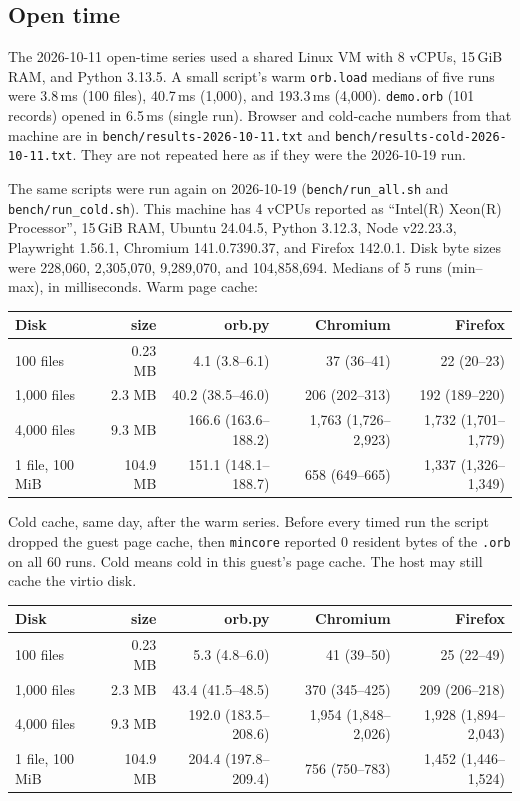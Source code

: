 \documentclass[11pt]{article}
\begin{document}
\subsection{Open time}

The 2026-10-11 open-time series used a shared Linux VM with 8 vCPUs, 15\,GiB RAM, and Python 3.13.5.
A small script's warm \texttt{orb.load} medians of five runs were 3.8\,ms (100 files), 40.7\,ms (1,000), and 193.3\,ms (4,000).
\texttt{demo.orb} (101 records) opened in 6.5\,ms (single run).
Browser and cold-cache numbers from that machine are in \texttt{bench/results-2026-10-11.txt} and \texttt{bench/results-cold-2026-10-11.txt}.
They are not repeated here as if they were the 2026-10-19 run.

The same scripts were run again on 2026-10-19 (\texttt{bench/run\_all.sh} and \texttt{bench/run\_cold.sh}).
This machine has 4 vCPUs reported as ``Intel(R) Xeon(R) Processor'', 15\,GiB RAM, Ubuntu 24.04.5, Python 3.12.3, Node v22.23.3, Playwright 1.56.1, Chromium 141.0.7390.37, and Firefox 142.0.1.
Disk byte sizes were 228{,}060, 2{,}305{,}070, 9{,}289{,}070, and 104{,}858{,}694.
Medians of 5 runs (min--max), in milliseconds.
Warm page cache:

\begin{center}
\small
\begin{tabular}{lrrrr}
\toprule
Disk & size & orb.py & Chromium & Firefox \\
\midrule
100 files & 0.23 MB & 4.1 (3.8--6.1) & 37 (36--41) & 22 (20--23) \\
1,000 files & 2.3 MB & 40.2 (38.5--46.0) & 206 (202--313) & 192 (189--220) \\
4,000 files & 9.3 MB & 166.6 (163.6--188.2) & 1{,}763 (1{,}726--2{,}923) & 1{,}732 (1{,}701--1{,}779) \\
1 file, 100 MiB & 104.9 MB & 151.1 (148.1--188.7) & 658 (649--665) & 1{,}337 (1{,}326--1{,}349) \\
\bottomrule
\end{tabular}
\end{center}

Cold cache, same day, after the warm series.
Before every timed run the script dropped the guest page cache, then \texttt{mincore} reported 0 resident bytes of the \texttt{.orb} on all 60 runs.
Cold means cold in this guest's page cache.
The host may still cache the virtio disk.

\begin{center}
\small
\begin{tabular}{lrrrr}
\toprule
Disk & size & orb.py & Chromium & Firefox \\
\midrule
100 files & 0.23 MB & 5.3 (4.8--6.0) & 41 (39--50) & 25 (22--49) \\
1,000 files & 2.3 MB & 43.4 (41.5--48.5) & 370 (345--425) & 209 (206--218) \\
4,000 files & 9.3 MB & 192.0 (183.5--208.6) & 1{,}954 (1{,}848--2{,}026) & 1{,}928 (1{,}894--2{,}043) \\
1 file, 100 MiB & 104.9 MB & 204.4 (197.8--209.4) & 756 (750--783) & 1{,}452 (1{,}446--1{,}524) \\
\bottomrule
\end{tabular}
\end{center}
\end{document}
